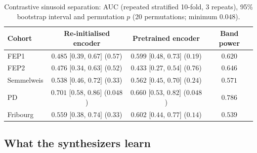 \documentclass[pdflatex,referee,sn-basic]{sn-jnl}%
\begin{document}
\begin{table}[!htbp]
    \centering
    \caption{Contrastive sinusoid separation: AUC (repeated stratified 10-fold, 3 repeats), 95\% bootstrap interval and permutation $p$ (20 permutations; minimum $0.048$).}
    \label{tab:contrastive}
    \footnotesize\setlength{\tabcolsep}{4pt}
    \begin{tabular}{@{}l c c c@{}}
        \hline
        \hline
        \hfil Cohort & \hfil Re-initialised encoder & \hfil Pretrained encoder & \hfil Band power \\
        \hline
        FEP1 & $0.485$ [$0.39$, $0.67$] ($0.57$) & $0.599$ [$0.48$, $0.73$] ($0.19$) & $0.620$ \\
        FEP2 & $0.476$ [$0.34$, $0.63$] ($0.52$) & $0.433$ [$0.27$, $0.54$] ($0.76$) & $0.646$ \\
        Semmelweis & $0.538$ [$0.46$, $0.72$] ($0.33$) & $0.562$ [$0.45$, $0.70$] ($0.24$) & $0.571$ \\
        PD & $0.701$ [$0.58$, $0.86$] ($0.048$) & $0.660$ [$0.53$, $0.82$] ($0.048$) & $0.786$ \\
        Fribourg & $0.559$ [$0.38$, $0.74$] ($0.33$) & $0.602$ [$0.44$, $0.77$] ($0.14$) & $0.539$ \\
        \hline
        \hline
    \end{tabular}
\end{table}

\subsection{What the synthesizers learn}\label{section:res_fidelity}
\end{document}
